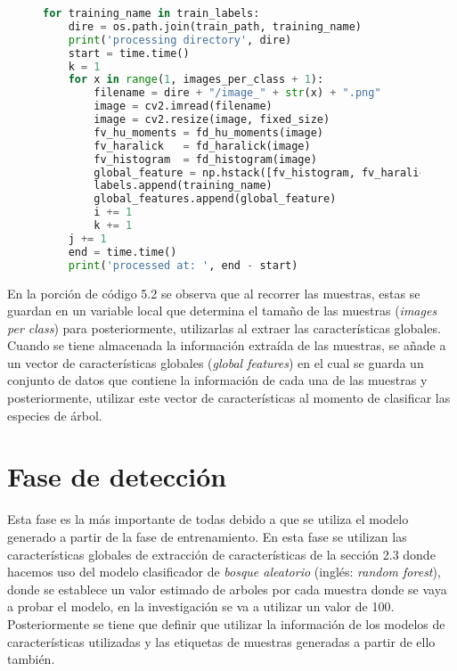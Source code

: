 \begin{figure}[H]
\centering
\begin{lstlisting}[basicstyle=\small, language=Python, caption=Código para entrenar modelo]
for training_name in train_labels:
    dire = os.path.join(train_path, training_name)
    print('processing directory', dire)
    start = time.time()
    k = 1
    for x in range(1, images_per_class + 1):
        filename = dire + "/image_" + str(x) + ".png"
        image = cv2.imread(filename)
        image = cv2.resize(image, fixed_size)
        fv_hu_moments = fd_hu_moments(image)
        fv_haralick   = fd_haralick(image)
        fv_histogram  = fd_histogram(image)
        global_feature = np.hstack([fv_histogram, fv_haralick, fv_hu_moments])
        labels.append(training_name)
        global_features.append(global_feature)
        i += 1
        k += 1
    j += 1
    end = time.time()
    print('processed at: ', end - start)
\end{lstlisting}
\label{Recorriendo-folders}
\end{figure}
En la porción de código 5.2 se observa que al recorrer las muestras, estas se guardan en un variable local que determina el tamaño de las muestras (\emph{images per class}) para posteriormente, utilizarlas al extraer las características globales. Cuando se tiene almacenada la información extraída de las muestras, se añade a un vector de características globales (\emph{global features}) en el cual se guarda un conjunto de datos que contiene la información de cada una de las muestras y posteriormente, utilizar este vector de características al momento de clasificar las especies de árbol. 

\section{Fase de detección}
Esta fase es la más importante de todas debido a que se utiliza el modelo generado a partir de la fase de entrenamiento. En esta fase se utilizan las características globales de extracción de características de la sección 2.3 donde hacemos uso del modelo clasificador de {\em bosque aleatorio} (inglés: {\em random forest})\footnotemark, donde se establece un valor estimado de arboles por cada muestra donde se vaya a probar el modelo, en la investigación se va a utilizar un valor de 100. Posteriormente se tiene que definir que utilizar la información de los modelos de características utilizadas y las etiquetas de muestras generadas a partir de ello también. 
\\

